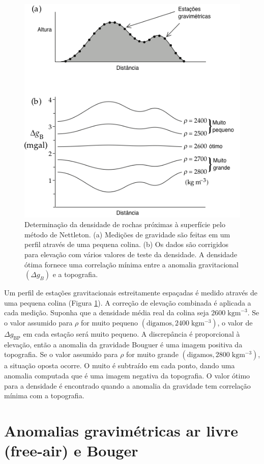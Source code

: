 \documentclass[]{book}
\theoremstyle{definition}
\theoremstyle{definition}
\theoremstyle{definition}
\theoremstyle{remark}
\begin{document}
\begin{figure}

{\centering \includegraphics[width=0.6\linewidth]{fig/Fig_02.35} 

}

\caption{Determinação da densidade de rochas próximas à superfície pelo método de Nettleton. (a) Medições de gravidade são feitas em um perfil através de uma pequena colina. (b) Os dados são corrigidos para elevação com vários valores de teste da densidade. A densidade ótima fornece uma correlação mínima entre a anomalia gravitacional $(\Delta g_{B})$ e a topografia.}\label{fig:nettleton}
\end{figure}

Um perfil de estações gravitacionais estreitamente espaçadas é medido através de uma pequena colina (Figura \ref{fig:nettleton}). A correção de elevação combinada é aplicada a cada medição. Suponha que a densidade média real da colina seja \(2600\; \mathrm{kgm}^{-3}\). Se o valor assumido para \(\rho\) for muito pequeno \(\left(\text{digamos}, 2400\; \mathrm{kg} \mathrm{m}^{-3}\right)\), o valor de \(\Delta g_{\mathrm{BP}}\) em cada estação será muito pequeno. A discrepância é proporcional à elevação, então a anomalia da gravidade Bouguer é uma imagem positiva da topografia. Se o valor assumido para \(\rho\) for muito grande \(\left(\text{digamos}, 2800\; \mathrm{kg} \mathrm{m}^{-3}\right)\), a situação oposta ocorre. O muito é subtraído em cada ponto, dando uma anomalia computada que é uma imagem negativa da topografia. O valor ótimo para a densidade é encontrado quando a anomalia da gravidade tem correlação mínima com a topografia.

\hypertarget{anomalias-gravimetricas-ar-livre-free-air-e-bouger}{%
\section{Anomalias gravimétricas ar livre (free-air) e Bouger}\label{anomalias-gravimetricas-ar-livre-free-air-e-bouger}}
\end{document}
